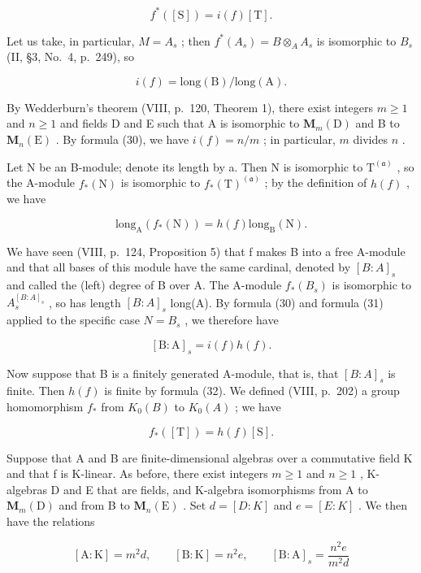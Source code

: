 \[
f ^ {*} ([ \mathrm{S} ]) = i (f) [ \mathrm{T} ].\tag{29}
\]

Let us take, in particular, \(M = A_{s}\) ; then \(f^{*}(A_{s}) = B \otimes_{A} A_{s}\) is isomorphic to \(B_{s}\) (II, §3, No.~4, p.~249), so

\[
i (f) = \mathrm{long(B)} / \mathrm{long(A)}.\tag{30}
\]

By Wedderburn's theorem (VIII, p.~120, Theorem 1), there exist integers \(m \geqslant 1\) and \(n \geqslant 1\) and fields D and E such that A is isomorphic to \(\mathbf{M}_m(\mathrm{D})\) and B to \(\mathbf{M}_n(\mathrm{E})\) . By formula (30), we have \(i(f) = n / m\) ; in particular, \(m\) divides \(n\) .

Let N be an B-module; denote its length by a. Then N is isomorphic to \(\mathrm{T}^{(\mathfrak{a})}\) , so the A-module \(f_{*}(\mathrm{N})\) is isomorphic to \(f_{*}(\mathrm{T})^{(\mathfrak{a})}\) ; by the definition of \(h(f)\) , we have

\[
\mathrm{long} _ {\mathrm{A}} (f _ {*} (\mathrm{N})) = h (f) \mathrm{long} _ {\mathrm{B}} (\mathrm{N}).\tag{31}
\]

We have seen (VIII, p.~124, Proposition 5) that f makes B into a free A-module and that all bases of this module have the same cardinal, denoted by \([B:A]_{s}\) and called the (left) degree of B over A. The A-module \(f_{*}(B_{s})\) is isomorphic to \(A_{s}^{[B:A]_{s}}\) , so has length \([B:A]_{s}\) long(A). By formula (30) and formula (31) applied to the specific case \(N=B_{s}\) , we therefore have

\[
[ \mathrm{B}: \mathrm{A} ] _ {s} = i (f) h (f).\tag{32}
\]

Now suppose that B is a finitely generated A-module, that is, that \([B:A]_{s}\) is finite. Then \(h(f)\) is finite by formula (32). We defined (VIII, p.~202) a group homomorphism \(f_{*}\) from \(K_{0}(B)\) to \(K_{0}(A)\) ; we have

\[
f _ {*} ([ \mathrm{T} ]) = h (f) [ \mathrm{S} ].\tag{33}
\]

Suppose that A and B are finite-dimensional algebras over a commutative field K and that f is K-linear. As before, there exist integers \(m \geqslant 1\) and \(n \geqslant 1\) , K-algebras D and E that are fields, and K-algebra isomorphisms from A to \(\mathbf{M}_{m}(\mathrm{D})\) and from B to \(\mathbf{M}_{n}(\mathrm{E})\) . Set \(d = [D : K]\) and \(e = [E : K]\) . We then have the relations

\[
[ \mathrm{A}: \mathrm{K} ] = m ^ {2} d, \qquad [ \mathrm{B}: \mathrm{K} ] = n ^ {2} e, \qquad [ \mathrm{B}: \mathrm{A} ] _ {s} = \frac {n ^ {2} e}{m ^ {2} d}
\]


